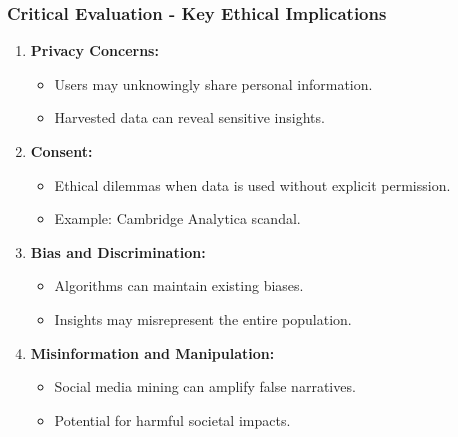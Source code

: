 \documentclass{beamer}
\begin{document}
\begin{frame}[fragile]
    \frametitle{Critical Evaluation - Key Ethical Implications}
    \begin{enumerate}
        \item \textbf{Privacy Concerns:} 
            \begin{itemize}
                \item Users may unknowingly share personal information.
                \item Harvested data can reveal sensitive insights.
            \end{itemize}
        
        \item \textbf{Consent:}
            \begin{itemize}
                \item Ethical dilemmas when data is used without explicit permission.
                \item Example: Cambridge Analytica scandal.
            \end{itemize}
        
        \item \textbf{Bias and Discrimination:}
            \begin{itemize}
                \item Algorithms can maintain existing biases.
                \item Insights may misrepresent the entire population.
            \end{itemize}
        
        \item \textbf{Misinformation and Manipulation:}
            \begin{itemize}
                \item Social media mining can amplify false narratives.
                \item Potential for harmful societal impacts.
            \end{itemize}
    \end{enumerate}
\end{frame}
\end{document}
